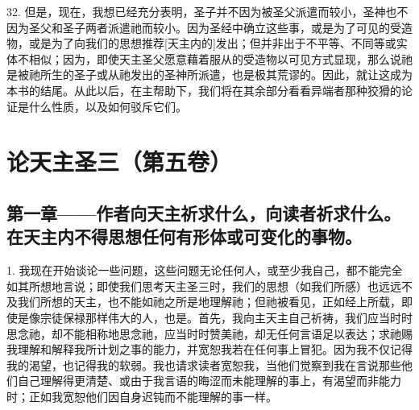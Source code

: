 32. 但是，现在，我想已经充分表明，圣子并不因为被圣父派遣而较小，圣神也不因为圣父和圣子两者派遣祂而较小。因为圣经中确立这些事，或是为了可见的受造物，或是为了向我们的思想推荐[天主内的]发出；但并非出于不平等、不同等或实体不相似；因为，即使天主圣父愿意藉着服从的受造物以可见方式显现，那么说祂是被祂所生的圣子或从祂发出的圣神所派遣，也是极其荒谬的。因此，就让这成为本书的结尾。从此以后，在主帮助下，我们将在其余部分看看异端者那种狡猾的论证是什么性质，以及如何驳斥它们。\par



\section{论天主圣三（第五卷）}

\par


\subsection{第一章——作者向天主祈求什么，向读者祈求什么。在天主内不得思想任何有形体或可变化的事物。}

1. 我现在开始谈论一些问题，这些问题无论任何人，或至少我自己，都不能完全如其所想地言说；即使我们思考天主圣三时，我们的思想（如我们所感）也远远不及我们所想的天主，也不能如祂之所是地理解祂；但祂被看见，正如经上所载，即使是像宗徒保禄那样伟大的人，也是。首先，我向主天主自己祈祷，我们应当时时思念祂，却不能相称地思念祂，应当时时赞美祂，却无任何言语足以表达；求祂赐我理解和解释我所计划之事的能力，并宽恕我若在任何事上冒犯。因为我不仅记得我的渴望，也记得我的软弱。我也请求读者宽恕我，当他们觉察到我在言说那些他们自己理解得更清楚、或由于我言语的晦涩而未能理解的事上，有渴望而非能力时；正如我宽恕他们因自身迟钝而不能理解的事一样。\par

